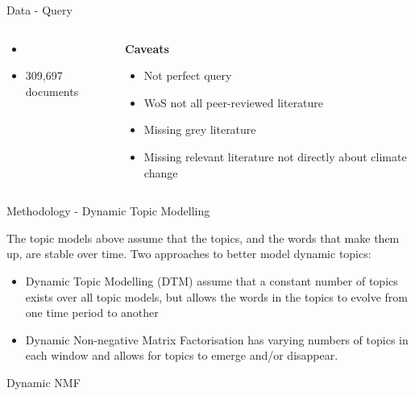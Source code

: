 \documentclass[9pt]{beamer}
\begin{document}
\begin{frame}{Data - Query}
\begin{columns}
\begin{column}{0.65\linewidth}
		\normalsize
		\begin{itemize}
			\item \citep{Haunschild2016}
			\item 309,697 documents
		\end{itemize}
	\end{column}
	\begin{column}{0.35\linewidth}
		\textbf{Caveats}
		\begin{itemize}
			\item Not perfect query
			\item WoS not all peer-reviewed literature
			\item Missing grey literature
			\item Missing relevant literature not directly about climate change
		\end{itemize}
	\end{column}
\end{columns}
\end{frame}

\begin{frame}{Methodology - Dynamic Topic Modelling}

The topic models above assume that the topics, and the words that make them up, are stable over time. Two approaches to better model dynamic topics:

\begin{itemize}
	\item<2->Dynamic Topic Modelling (DTM) \citep{Blei2006} assume that a constant number of topics exists over all topic models, but allows the words in the topics to evolve from one time period to another
	\item<3->Dynamic Non-negative Matrix Factorisation \citep{Greene2016} has varying numbers of topics in each window and allows for topics to emerge and/or disappear.
\end{itemize}


\end{frame}



\begin{frame}[t]{Dynamic NMF}




\end{frame}
\end{document}
